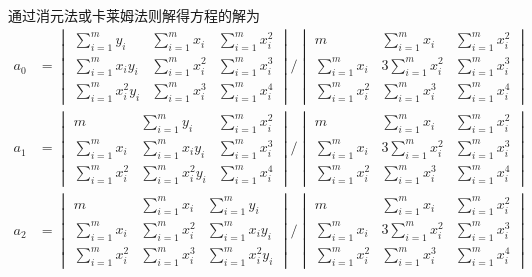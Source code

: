 \documentclass[12pt]{ctexart}
\begin{document}
	通过消元法或卡莱姆法则解得方程的解为
	\begin{equation*}
	\begin{aligned}
	a_0&=\begin{vmatrix}
	\sum\limits_{i=1}^{m}y_i&\sum\limits_{i=1}^{m}x_i&\sum\limits_{i=1}^{m}x_i^2 \\
	\sum\limits_{i=1}^{m}x_iy_i&\sum\limits_{i=1}^{m}x_i^2&\sum\limits_{i=1}^{m}x_i^3 \\
	\sum\limits_{i=1}^{m}x_i^2y_i&\sum\limits_{i=1}^{m}x_i^3&\sum\limits_{i=1}^{m}x_i^4
	\end{vmatrix}\bigg/
	\begin{vmatrix}
	m&\sum\limits_{i=1}^{m}x_i&\sum\limits_{i=1}^{m}x_i^2 \\
	\sum\limits_{i=1}^{m}x_i&3\sum\limits_{i=1}^{m}x_i^2&\sum\limits_{i=1}^{m}x_i^3 \\
	\sum\limits_{i=1}^{m}x_i^2&\sum\limits_{i=1}^{m}x_i^3&\sum\limits_{i=1}^{m}x_i^4
	\end{vmatrix} \\
	a_1&=\begin{vmatrix}
	m&\sum\limits_{i=1}^{m}y_i&\sum\limits_{i=1}^{m}x_i^2 \\
	\sum\limits_{i=1}^{m}x_i&\sum\limits_{i=1}^{m}x_iy_i&\sum\limits_{i=1}^{m}x_i^3 \\
	\sum\limits_{i=1}^{m}x_i^2&\sum\limits_{i=1}^{m}x_i^2y_i&\sum\limits_{i=1}^{m}x_i^4
	\end{vmatrix}\bigg/
	\begin{vmatrix}
	m&\sum\limits_{i=1}^{m}x_i&\sum\limits_{i=1}^{m}x_i^2 \\
	\sum\limits_{i=1}^{m}x_i&3\sum\limits_{i=1}^{m}x_i^2&\sum\limits_{i=1}^{m}x_i^3 \\
	\sum\limits_{i=1}^{m}x_i^2&\sum\limits_{i=1}^{m}x_i^3&\sum\limits_{i=1}^{m}x_i^4
	\end{vmatrix} \\
	a_2&=\begin{vmatrix}
	m&\sum\limits_{i=1}^{m}x_i&\sum\limits_{i=1}^{m}y_i \\
	\sum\limits_{i=1}^{m}x_i&\sum\limits_{i=1}^{m}x_i^2&\sum\limits_{i=1}^{m}x_iy_i \\
	\sum\limits_{i=1}^{m}x_i^2&\sum\limits_{i=1}^{m}x_i^3&\sum\limits_{i=1}^{m}x_i^2y_i
	\end{vmatrix}\bigg/
	\begin{vmatrix}
	m&\sum\limits_{i=1}^{m}x_i&\sum\limits_{i=1}^{m}x_i^2 \\
	\sum\limits_{i=1}^{m}x_i&3\sum\limits_{i=1}^{m}x_i^2&\sum\limits_{i=1}^{m}x_i^3 \\
	\sum\limits_{i=1}^{m}x_i^2&\sum\limits_{i=1}^{m}x_i^3&\sum\limits_{i=1}^{m}x_i^4
	\end{vmatrix}
	\end{aligned}
	\end{equation*}
	
\end{document}
